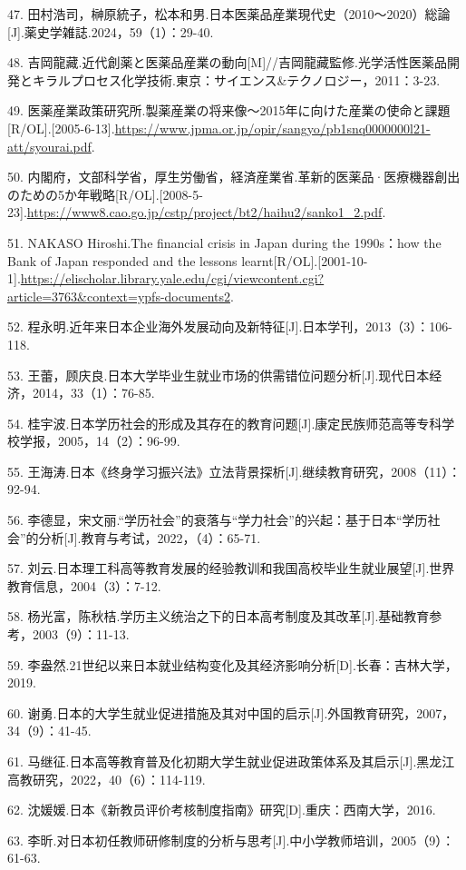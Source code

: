 47. 田村浩司，榊原統子，松本和男.日本医薬品産業現代史（2010～2020）総論[J].薬史学雑誌.2024，59（1）：29-40.

48. 吉岡龍藏.近代創薬と医薬品産業の動向[M]//吉岡龍藏監修.光学活性医薬品開発とキラルプロセス化学技術.東京：サイエンス\&テクノロジー，2011：3-23.

49. 医薬産業政策研究所.製薬産業の将来像～2015年に向けた産業の使命と課題[R/OL].\allowbreak{}[2005-6-13].\url{https://www.jpma.or.jp/opir/sangyo/pb1snq0000000l21-att/syourai.pdf}.

50. 内閣府，文部科学省，厚生労働省，経済産業省.革新的医薬品·医療機器創出のための5か年戦略[R/OL].\allowbreak{}[2008-5-23].\url{https://www8.cao.go.jp/cstp/project/bt2/haihu2/sanko1_2.pdf}.

51. NAKASO Hiroshi.The financial crisis in Japan during the 1990s：how the Bank of Japan responded and the lessons learnt[R/OL].\allowbreak{}[2001-10-1].\url{https://elischolar.library.yale.edu/cgi/viewcontent.cgi?article=3763&context=ypfs-documents2}.

52. 程永明.近年来日本企业海外发展动向及新特征[J].日本学刊，2013（3）：106-118.

53. 王蕾，顾庆良.日本大学毕业生就业市场的供需错位问题分析[J].现代日本经济，2014，33（1）：76-85.

54. 桂宇波.日本学历社会的形成及其存在的教育问题[J].康定民族师范高等专科学校学报，2005，14（2）：96-99.

55. 王海涛.日本《终身学习振兴法》立法背景探析[J].继续教育研究，2008（11）：92-94.

56. 李德显，宋文丽.“学历社会”的衰落与“学力社会”的兴起：基于日本“学历社会”的分析[J].教育与考试，2022，（4）：65-71.

57. 刘云.日本理工科高等教育发展的经验教训和我国高校毕业生就业展望[J].世界教育信息，2004（3）：7-12.

58. 杨光富，陈秋桔.学历主义统治之下的日本高考制度及其改革[J].基础教育参考，2003（9）：11-13.

59. 李盎然.21世纪以来日本就业结构变化及其经济影响分析[D].长春：吉林大学，2019.

60. 谢勇.日本的大学生就业促进措施及其对中国的启示[J].外国教育研究，2007，34（9）：41-45.

61. 马继征.日本高等教育普及化初期大学生就业促进政策体系及其启示[J].黑龙江高教研究，2022，40（6）：114-119.

62. 沈媛媛.日本《新教员评价考核制度指南》研究[D].重庆：西南大学，2016.

63. 李昕.对日本初任教师研修制度的分析与思考[J].中小学教师培训，2005（9）：61-63.

